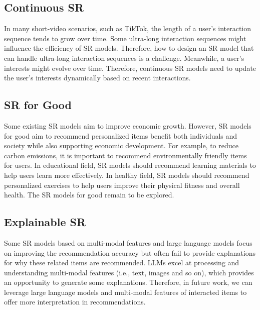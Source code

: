 \documentclass[review]{fcs}
\begin{document}
	\subsection{Continuous SR}
	In many short-video scenarios, such as TikTok, the length of a user's interaction sequence tends to grow over time. Some ultra-long interaction sequences might influence the efficiency of SR models. Therefore, how to design an SR model that can handle ultra-long interaction sequences is a challenge. Meanwhile, a user's interests might evolve over time. Therefore, continuous SR models need to update the user's interests dynamically based on recent interactions.
	\subsection{SR for Good}
	Some existing SR models aim to improve economic growth. However, SR models for good aim to recommend personalized items benefit both individuals and society while also supporting economic development. For example, to reduce carbon emissions, it is important to recommend environmentally friendly items for users. In educational field, SR models should recommend learning materials to help users learn more effectively. In healthy field, SR models should recommend personalized exercises to help users improve their physical fitness and overall health. The SR models for good remain to be explored.
	\subsection{Explainable SR}
	Some SR models based on multi-modal features and large language models focus on improving the recommendation accuracy but often fail to provide explanations for why these related items are recommended. LLMs excel at processing and understanding multi-modal features (i.e., text, images and so on), which provides an opportunity to generate some explanations. Therefore, in future work, we can leverage large language models and multi-modal features of interacted items to offer more interpretation in recommendations.
\end{document}
